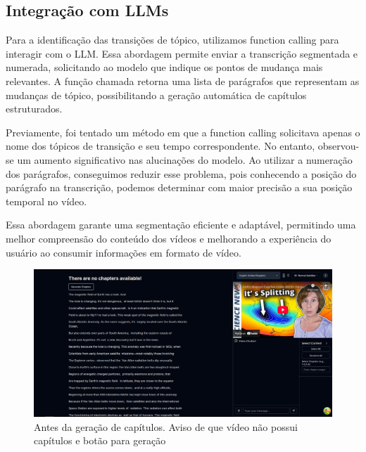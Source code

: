 \documentclass[tcc,capa]{texufpel}
\begin{document}
\subsection{Integra\c{c}\~{a}o com LLMs}

Para a identifica\c{c}\~{a}o das transi\c{c}\~{o}es de t\'opico, utilizamos function calling para interagir com o LLM. Essa abordagem permite enviar a transcri\c{c}\~{a}o segmentada e numerada, solicitando ao modelo que indique os pontos de mudan\c{c}a mais relevantes. A fun\c{c}\~{a}o chamada retorna uma lista de par\'{a}grafos que representam as mudan\c{c}as de t\'opico, possibilitando a gera\c{c}\~{a}o autom\'atica de cap\'{i}tulos estruturados.

Previamente, foi tentado um m\'etodo em que a function calling solicitava apenas o nome dos t\'opicos de transi\c{c}\~{a}o e seu tempo correspondente. No entanto, observou-se um aumento significativo nas alucina\c{c}\~{o}es do modelo. Ao utilizar a numera\c{c}\~{a}o dos par\'{a}grafos, conseguimos reduzir esse problema, pois conhecendo a posi\c{c}\~{a}o do par\'{a}grafo na transcri\c{c}\~{a}o, podemos determinar com maior precis\~{a}o a sua posi\c{c}\~{a}o temporal no v\'{i}deo.

Essa abordagem garante uma segmenta\c{c}\~{a}o eficiente e adapt\'avel, permitindo uma melhor compreens\~{a}o do conte\'udo dos v\'{i}deos e melhorando a experi\^{e}ncia do usu\'ario ao consumir informa\c{c}\~{o}es em formato de v\'{i}deo.



\begin{figure}[H]
  \centering
  \includegraphics[width=\textwidth,height=0.45\textheight,keepaspectratio]{exemplo-slides/graphics/images/generate-chapters.png}
  \caption{Antes da geração de capítulos. Aviso de que vídeo não possui capítulos e botão para geração}
  \label{fig:generate_chapters_before}
\end{figure}
\end{document}
